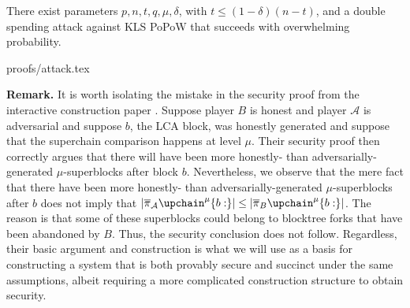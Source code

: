 \begin{theorem}
There exist parameters $p, n, t, q,  \mu, \delta$, with $t\leq (1-\delta)(n-t)$,
and a double spending attack against KLS PoPoW that succeeds with overwhelming
probability.
\end{theorem}
{proofs/attack.tex}

\noindent\textbf{Remark.}
It is worth isolating the mistake in the security proof from
the interactive construction paper \cite{KLS}. Suppose player $B$ is honest and
player $\mathcal{A}$ is adversarial and suppose $b$, the LCA block, was honestly
generated and suppose that the superchain comparison happens at level $\mu$.
Their security proof then correctly argues that there will have been more
honestly- than adversarially-generated $\mu$-superblocks after block $b$.
Nevertheless, we observe that the mere fact that there have been more honestly-
than adversarially-generated $\mu$-superblocks after $b$ does not imply that
$|\overline\pi_\mathcal{A}\upchain^\mu\{b:\}| \leq
|\overline\pi_B\upchain^\mu\{b:\}|$. The reason is that some of these
superblocks could belong to blocktree forks that have been abandoned by $B$.
Thus, the security conclusion does not follow. Regardless, their basic argument
and construction is what we will use as a basis for constructing a system that
is both provably secure and succinct under the same assumptions, albeit
requiring a more complicated construction structure to obtain security.
